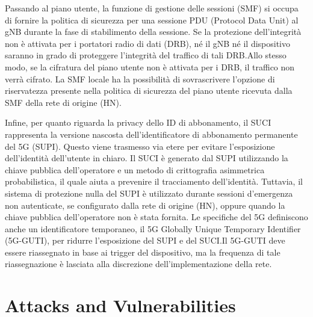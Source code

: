 \documentclass[english]{article}
\begin{document}
Passando al piano utente, la funzione di gestione delle sessioni (SMF) si
occupa di fornire la politica di sicurezza per una sessione PDU (Protocol Data
Unit) al gNB durante la fase di stabilimento della sessione. Se la protezione
dell'integrità non è attivata per i portatori radio di dati (DRB), né il gNB né
il dispositivo saranno in grado di proteggere l'integrità del traffico di tali
DRB.\@ Allo stesso modo, se la cifratura del piano utente non è attivata per i
DRB, il traffico non verrà cifrato. La SMF locale ha la possibilità di
sovrascrivere l'opzione di riservatezza presente nella politica di sicurezza
del piano utente ricevuta dalla SMF della rete di origine (HN).

Infine, per quanto riguarda la privacy dello ID di abbonamento, il SUCI
rappresenta la versione nascosta dell'identificatore di abbonamento permanente
del 5G (SUPI). Questo viene trasmesso via etere per evitare l'esposizione
dell'identità dell'utente in chiaro. Il SUCI è generato dal SUPI utilizzando la
chiave pubblica dell'operatore e un metodo di crittografia asimmetrica
probabilistica, il quale aiuta a prevenire il tracciamento dell'identità.
Tuttavia, il sistema di protezione nulla del SUPI è utilizzato durante sessioni
d'emergenza non autenticate, se configurato dalla rete di origine (HN), oppure
quando la chiave pubblica dell'operatore non è stata fornita. Le specifiche del
5G definiscono anche un identificatore temporaneo, il 5G Globally Unique
Temporary Identifier (5G-GUTI), per ridurre l'esposizione del SUPI e del
SUCI.\@ Il 5G-GUTI deve essere riassegnato in base ai trigger del dispositivo,
ma la frequenza di tale riassegnazione è lasciata alla discrezione
dell'implementazione della rete.

\section{Attacks and Vulnerabilities}
\end{document}
